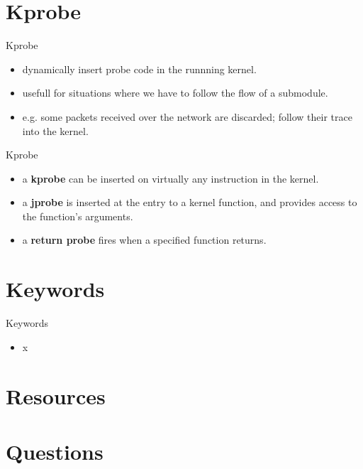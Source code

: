 \documentclass{workshop}
\begin{document}
\section{Kprobe}
\begin{frame}{Kprobe}
\begin{itemize}
\item dynamically insert probe code in the runnning kernel.
\item usefull for situations where we have to follow the flow of a submodule.
\item e.g. some packets received over the network are discarded; follow their
trace into the kernel.
\end{itemize}
\end{frame}

\begin{frame}{Kprobe}
\begin{itemize}
\item  a \textbf{kprobe} can be inserted on virtually any instruction in the kernel.
\item a \textbf{jprobe} is inserted at the entry to a kernel function, and provides access to the
function's arguments.
\item a \textbf{return probe} fires when a specified function returns.
\end{itemize}
\end{frame}

\section{Keywords}
\begin{frame}{Keywords}
      \begin{itemize}
        \item x
      \end{itemize}
\end{frame}

\section{Resources}

\section{Questions}
\end{document}
